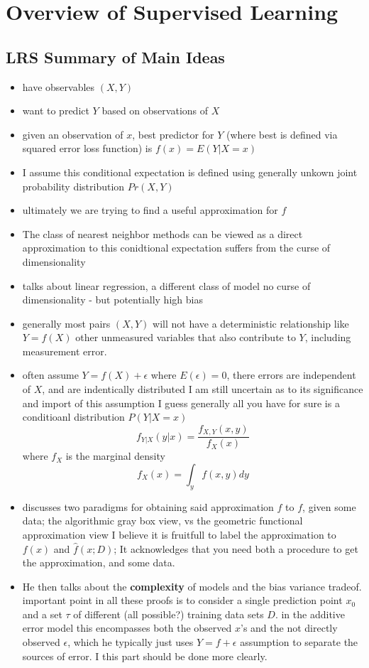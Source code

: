 \setcounter{chapter}{1}
\chapter{Overview of Supervised Learning}

\setcounter{section}{-1}
\section{LRS Summary of Main Ideas}
\begin{itemize}
  \item have observables $(X,Y)$
  \item want to predict $Y$ based on observations of $X$
  \item given an observation of $x$, best predictor for $Y$ (where best is defined via squared error loss function) is $f(x) = E(Y | X = x)$
  \item I assume this conditional expectation is defined using generally unkown joint probability distribution $Pr(X,Y)$
  \item ultimately we are trying to find a useful approximation for $f$
  \item The class of nearest neighbor methods can be viewed as a direct approximation to this conidtional expectation
    \subitem suffers from the curse of dimensionality
  \item talks about linear regression, a different class of model
    \subitem no curse of dimensionality - but potentially high bias
  \item generally most pairs $(X,Y)$ will not have a deterministic relationship like $Y = f(X)$
    \subitem other unmeasured variables that also contribute to $Y$, including measurement error.
  \item often assume $Y = f(X) + \epsilon$ where $E(\epsilon) = 0$, there errors are independent of $X$, and are indentically distributed
    \subitem I am still uncertain as to its significance and import of this assumption {\gray
    \subitem I guess generally all you have for sure is a conditioanl distribution $P(Y | X = x)$
    $$ f_{Y|X}(y|x) = \frac{f_{X,Y}(x,y)}{f_X(x)} $$
    where $f_X$ is the marginal density 
  $$f_X(x) = \int_y f(x,y)dy $$ }
  \item discusses two paradigms for obtaining said approximation $\hat{f}$ to $f$, given some data; the algorithmic gray box view, vs the geometric functional approximation view
    \subitem I believe it is fruitfull to label the approximation to $f(x)$ and $\hat{f}(x;D)$; It acknowledges that you need both a procedure to get the approximation, and some data.
  \item He then talks about the {\bf complexity} of models and the bias variance tradeof.
    \subitem important point in all these proofs is to consider a single prediction point $x_0$ and a set $\tau$ of different (all possible?) training data sets $D$.
    \subitem in the additive error model this encompasses both the observed $x$'s and the not directly observed $\epsilon$, which he typically just uses $Y = f + \epsilon$ assumption to separate the sources of error.
    \subitem I this part should be done more clearly.
\end{itemize}

